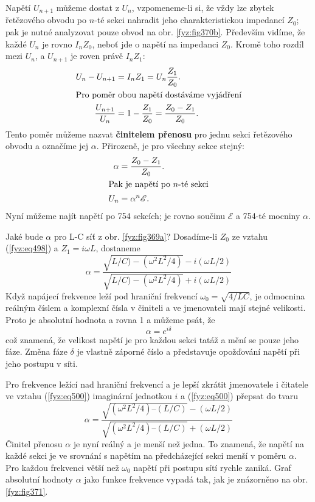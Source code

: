   Napětí \(U_{n+1}\) můžeme dostat z \(U_n\), vzpomeneme-li si, že vždy lze zbytek řetězového 
  obvodu po \(n\)-té sekci nahradit jeho charakteristickou impedancí \(Z_0\); pak je nutné 
  analyzovat pouze obvod na obr. \ref{fyz:fig370b}. Především vidíme, že každé \(U_n\) je rovno 
  \(I_nZ_0\), neboť jde o napětí na impedanci \(Z_0\). Kromě toho rozdíl mezi \(U_n\), a 
  \(U_{n+1}\) je roven právě \(I_nZ_1\):
  \begin{align*}
    U_n - U_{n+1}       &= I_nZ_1 = U_n\frac{Z_1}{Z_0}.  \\
    \shortintertext{Pro poměr obou napětí dostáváme vyjádření} 
    \frac{U_{n+1}}{U_n} &= 1 - \frac{Z_1}{Z_0} = \frac{Z_0 -Z_1}{Z_0}.
  \end{align*}
  Tento poměr můžeme nazvat \textbf{činitelem přenosu} pro jednu sekci řetězového obvodu a označíme 
  jej \(\alpha\). Přirozeně, je pro všechny sekce stejný: 
  \begin{align*}
    \alpha  &= \frac{Z_0 -Z_1}{Z_0}.  \\
    \shortintertext{Pak je napětí po \(n\)-té sekci} 
    U_n     &= \alpha^n\mathscr{E}.
  \end{align*}
  Nyní můžeme najít napětí po \num{754} sekcích; je rovno součinu \(\mathscr{E}\) a \num{754}-té 
  mocniny \(\alpha\). 
  
  Jaké bude \(\alpha\) pro L-C síť z obr. \ref{fyz:fig369a}? Dosadíme-li \(Z_0\) ze vztahu 
  (\ref{fyz:eq498}) a \(Z_1 =i\omega L\), dostaneme
  \begin{equation}\label{fyz:eq500}
    \alpha = \dfrac{\sqrt{L/C) - (\omega^2L^2/4)} - i(\omega L/2)}
                   {\sqrt{L/C) - (\omega^2L^2/4)} + i(\omega L/2)}
  \end{equation}
  Když napájecí frekvence leží pod hraniční frekvencí \(\omega_0 =\sqrt{4/LC}\), je odmocnina 
  reálným číslem a komplexní čísla v činiteli a ve jmenovateli mají stejné velikosti. Proto je 
  absolutní hodnota a rovna 1 a můžeme psát, že
  \begin{equation*}
    \alpha = e^{i\delta}
  \end{equation*}
  což znamená, že velikost napětí je pro každou sekci tatáž a mění se pouze jeho fáze. Změna fáze 
  \(\delta\) je vlastně záporné číslo a představuje opožďování napětí při jeho postupu v síti. 
  
  Pro frekvence ležící nad hraniční frekvencí a je lepší zkrátit jmenovatele i čitatele ve vztahu 
  (\ref{fyz:eq500}) imaginární jednotkou \(i\) a (\ref{fyz:eq500}) přepsat do tvaru
  \begin{equation}\label{fyz:eq501}
    \alpha = \dfrac{\sqrt{(\omega^2L^2/4) – (L/C)} - (\omega L/2)}
                   {\sqrt{(\omega^2L^2/4) – (L/C)} + (\omega L/2)}
  \end{equation}
  Činitel přenosu \(\alpha\) je nyní reálný a je menší než jedna. To znamená, že napětí na každé 
  sekci je ve srovnání s napětím na předcházející sekci menší v poměru \(\alpha\). Pro každou 
  frekvenci větší než \(\omega_0\) napětí při postupu sítí rychle zaniká. Graf absolutní hodnoty 
  \(\alpha\) jako funkce frekvence vypadá tak, jak je znázorněno na obr. \ref{fyz:fig371}. 
  
